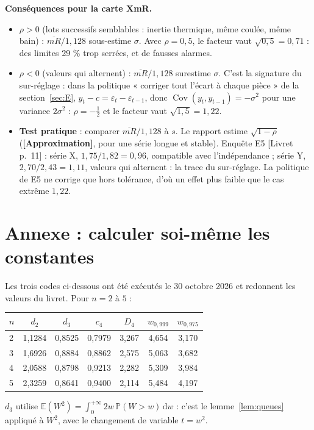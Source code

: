 \documentclass[11pt,a4paper]{article}
\theoremstyle{tq}
\theoremstyle{remark}
\newcommand{\appr}{\textcolor{uimmred}{\textbf{[Approximation]}}}
\newcommand{\liv}[1]{\textcolor{uimmblue}{\small[Livret p.~#1]}}
\newcommand{\E}{\mathbb{E}}
\renewcommand{\P}{\mathbb{P}}
\newcommand{\dd}{\,\mathrm{d}}
\newcommand{\mRb}{\overline{mR}}
\begin{document}
\textbf{Conséquences pour la carte XmR.}
\begin{itemize}[nosep,leftmargin=1.2em]
\item $\rho>0$ (lots successifs semblables : inertie thermique, même coulée, même bain) : $\mRb/1{,}128$ sous-estime $\sigma$. Avec $\rho=0{,}5$, le facteur vaut $\sqrt{0{,}5}=0{,}71$ : des limites 29 \% trop serrées, et de fausses alarmes.
\item $\rho<0$ (valeurs qui alternent) : $\mRb/1{,}128$ surestime $\sigma$. C'est la signature du sur-réglage : dans la politique « corriger tout l'écart à chaque pièce » de la section~\ref{sec:E}, $y_t-c=\varepsilon_t-\varepsilon_{t-1}$, donc $\operatorname{Cov}(y_t,y_{t-1})=-\sigma^2$ pour une variance $2\sigma^2$ : $\rho=-\frac12$ et le facteur vaut $\sqrt{1{,}5}=1{,}22$.
\item \textbf{Test pratique} : comparer $\mRb/1{,}128$ à $s$. Le rapport estime $\sqrt{1-\rho}$ (\appr{}, pour une série longue et stable). Enquête E5 \liv{11} : série X, $1{,}75/1{,}82=0{,}96$, compatible avec l'indépendance ; série Y, $2{,}70/2{,}43=1{,}11$, valeurs qui alternent : la trace du sur-réglage. La politique de E5 ne corrige que hors tolérance, d'où un effet plus faible que le cas extrême $1{,}22$.
\end{itemize}

\section{Annexe : calculer soi-même les constantes}\label{sec:code}

Les trois codes ci-dessous ont été exécutés le 30 octobre 2026 et redonnent les valeurs du livret. Pour $n=2$ à $5$ :
\begin{center}\small
\begin{tabular}{@{}lcccccc@{}}
\toprule
$n$ & $d_2$ & $d_3$ & $c_4$ & $D_4$ & $w_{0{,}999}$ & $w_{0{,}975}$\\
\midrule
2 & 1,1284 & 0,8525 & 0,7979 & 3,267 & 4,654 & 3,170\\
3 & 1,6926 & 0,8884 & 0,8862 & 2,575 & 5,063 & 3,682\\
4 & 2,0588 & 0,8798 & 0,9213 & 2,282 & 5,309 & 3,984\\
5 & 2,3259 & 0,8641 & 0,9400 & 2,114 & 5,484 & 4,197\\
\bottomrule
\end{tabular}
\end{center}
$d_3$ utilise $\E(W^2)=\int_0^{+\infty}2w\,\P(W>w)\dd w$ : c'est le lemme~\ref{lem:queues} appliqué à $W^2$, avec le changement de variable $t=w^2$.
\end{document}
